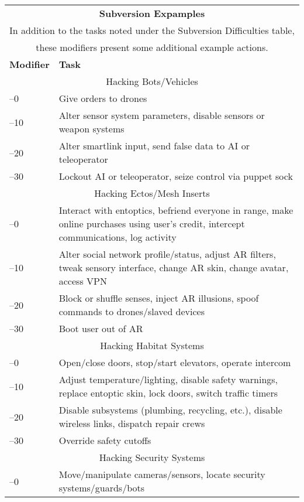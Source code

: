 \begin{table}
\begin{tabularx}{\textwidth}{|l|X|}
\hline
\multicolumn{2}{|c|}{\textbf{Subversion Expamples}} \\
\multicolumn{2}{|c|}{In addition to the tasks noted under the Subversion Difficulties table,} \\
\multicolumn{2}{|c|}{these modifiers present some additional example actions.} \\
\hline
\textbf{Modifier} & \textbf{Task} \\
\hline
\multicolumn{2}{|c|}{Hacking Bots/Vehicles} \\
\hline
–0 & Give orders to drones \\
\hline
–10 & Alter sensor system parameters, disable sensors or weapon systems \\
\hline
–20 & Alter smartlink input, send false data to AI or teleoperator \\
\hline
–30 & Lockout AI or teleoperator, seize control via puppet sock \\
\hline
\multicolumn{2}{|c|}{Hacking Ectos/Mesh Inserts} \\
\hline
–0 & Interact with entoptics, befriend everyone in range, make online purchases using user's credit, intercept communications, log activity \\
\hline
–10 & Alter social network profile/status, adjust AR filters, tweak sensory interface, change AR skin, change avatar, access VPN \\
\hline
–20 & Block or shuffle senses, inject AR illusions, spoof commands to drones/slaved devices \\
\hline
–30 & Boot user out of AR \\
\hline
\multicolumn{2}{|c|}{Hacking Habitat Systems} \\
\hline
–0 &  Open/close doors, stop/start elevators, operate intercom \\
\hline
–10 & Adjust temperature/lighting, disable safety warnings, replace entoptic skin, lock doors, switch traffic timers \\
\hline
–20 & Disable subsystems (plumbing, recycling, etc.), disable wireless links, dispatch repair crews \\
\hline
–30 & Override safety cutoffs \\
\hline
\multicolumn{2}{|c|}{Hacking Security Systems} \\
\hline
–0 & Move/manipulate cameras/sensors, locate security systems/guards/bots \\

\end{tabularx}
\end{table}
